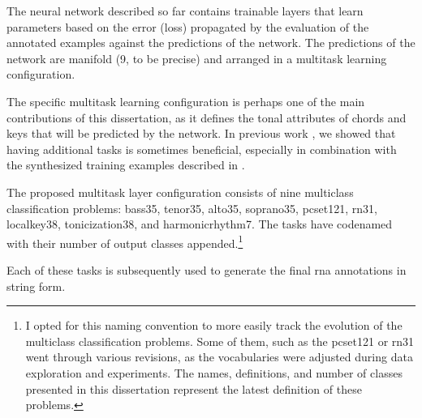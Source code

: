 
The neural network described so far contains trainable
layers that learn parameters based on the error (loss)
propagated by the evaluation of the annotated examples
against the predictions of the network. The predictions of
the network are manifold (9, to be precise) and arranged in
a multitask learning configuration.

The specific multitask learning configuration is perhaps one
of the main contributions of this dissertation, as it
defines the tonal attributes of chords and keys that will be
predicted by the network. In previous work
\parencite{napoleslopez2021augmentednet}, we showed that
having additional tasks is sometimes beneficial, especially
in combination with the synthesized training examples
described in .

The proposed multitask layer configuration consists of nine
multiclass classification problems: \gls{bass35},
\gls{tenor35}, \gls{alto35}, \gls{soprano35},
\gls{pcset121}, \gls{rn31}, \gls{localkey38},
\gls{tonicization38}, and \gls{harmonicrhythm7}. The tasks
have codenamed with their number of output classes
appended.\footnote{I opted for this naming convention to
more easily track the evolution of the multiclass
classification problems. Some of them, such as the
\gls{pcset121} or \gls{rn31} went through various revisions,
as the vocabularies were adjusted during data exploration
and experiments. The names, definitions, and number of
classes presented in this dissertation represent the latest
definition of these problems.}

Each of these tasks is subsequently used to generate the
final \gls{rna} annotations in string form.
